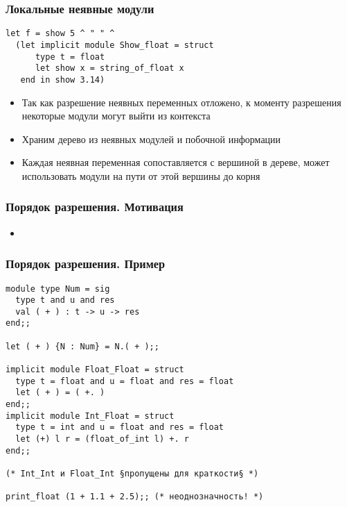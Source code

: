 \documentclass{beamer}
\begin{document}
\lstset{language=caml}
\begin{frame}[fragile]\frametitle{Локальные неявные модули}
\begin{lstlisting}
let f = show 5 ^ " " ^
  (let implicit module Show_float = struct
      type t = float
      let show x = string_of_float x
   end in show 3.14)
\end{lstlisting}
\begin{itemize}
\item Так как разрешение неявных переменных отложено, к моменту разрешения некоторые модули могут выйти из контекста
\item Храним дерево из неявных модулей и побочной информации
\item Каждая неявная переменная сопоставляется с вершиной в дереве, может использовать модули на пути от этой вершины до корня
\end{itemize}
\end{frame}


\begin{frame}\frametitle{Порядок разрешения. Мотивация}
\begin{itemize}
  \item
\end{itemize}
\end{frame}

\lstset{language=caml}
\begin{frame}[fragile]\frametitle{Порядок разрешения. Пример}
\begin{lstlisting}
module type Num = sig
  type t and u and res
  val ( + ) : t -> u -> res
end;;

let ( + ) {N : Num} = N.( + );;

implicit module Float_Float = struct
  type t = float and u = float and res = float
  let ( + ) = ( +. )
end;;
implicit module Int_Float = struct
  type t = int and u = float and res = float
  let (+) l r = (float_of_int l) +. r
end;;

(* Int_Int и Float_Int §пропущены для краткости§ *)

print_float (1 + 1.1 + 2.5);; (* неоднозначность! *)
\end{lstlisting}
\end{frame}
\end{document}
